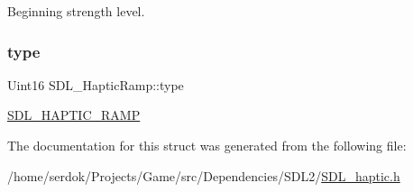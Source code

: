 Beginning strength level. \mbox{\label{structSDL__HapticRamp_aca1c2349372433822ab62f60976640aa}} 
\subsubsection{\texorpdfstring{type}{type}}
{\footnotesize\ttfamily Uint16 S\+D\+L\+\_\+\+Haptic\+Ramp\+::type}

\hyperlink{SDL__haptic_8h_af10eb937a64a8f602e9c46682ac0d868}{S\+D\+L\+\_\+\+H\+A\+P\+T\+I\+C\+\_\+\+R\+A\+MP} 

The documentation for this struct was generated from the following file\+:\begin{DoxyCompactItemize}
\item 
/home/serdok/\+Projects/\+Game/src/\+Dependencies/\+S\+D\+L2/\hyperlink{SDL__haptic_8h}{S\+D\+L\+\_\+haptic.\+h}\end{DoxyCompactItemize}

